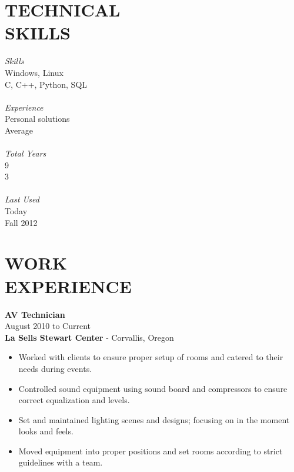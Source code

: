 \documentclass[mm]{res}
\begin{document}
\begin{resume}
\section{TECHNICAL \\ SKILLS} 
\begin{multicols}{4}
	{\sl Skills} \\
	Windows, Linux \\
	C, C++, Python, SQL \\ \\
	{\sl Experience} \\
	Personal solutions \\
	Average \\ \\
	{\sl Total Years} \\
	9 \\
	3 \\ \\ 
	{\sl Last Used} \\
	Today \\
	Fall 2012 \\
\end{multicols}
 
\section{WORK \\ EXPERIENCE}  
	\textbf{AV Technician} \\
	August 2010 to Current \\                
	\textbf{La Sells Stewart Center} - Corvallis, Oregon \\
\begin{itemize}
	\item Worked with clients to ensure proper setup of rooms and catered to their needs during events. \\
	\item Controlled sound equipment using sound board and compressors to ensure correct equalization and levels. \\
	\item Set and maintained lighting scenes and designs; focusing on in the moment looks  and feels. \\
	\item Moved equipment into proper positions and set rooms according to strict guidelines with a team. \\
\end{itemize}



\end{resume}
\end{document}
